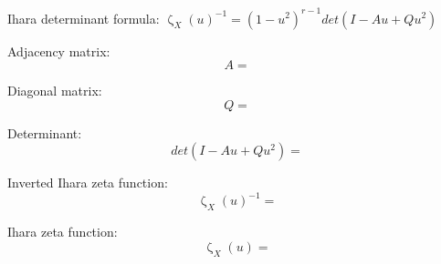\documentclass[12pt]{extarticle}
\begin{document}
Ihara determinant formula: $\upzeta_X(u)^{-1} = (1 - u^2)^{r-1}det(I-Au+Qu^2)$

\bigskip
Adjacency matrix: $$ A =  $$


\bigskip

Diagonal matrix: $$ Q =  $$

\bigskip

Determinant: $$det(I-Au+Qu^2) = $$

\bigskip

Inverted Ihara zeta function: $$\upzeta_X(u)^{-1} = $$

\bigskip

Ihara zeta function: $$\upzeta_X(u) = $$
\end{document}
